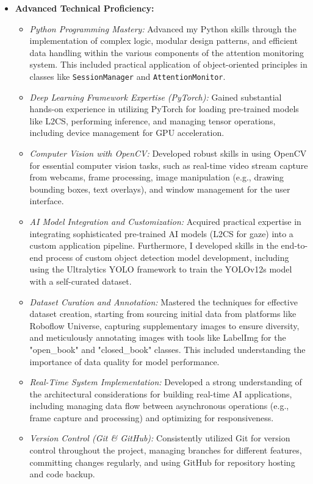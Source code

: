 \begin{itemize}
    \item \textbf{Advanced Technical Proficiency:}
    \begin{itemize}
        \item \textit{Python Programming Mastery:} Advanced my Python skills through the implementation of complex logic, modular design patterns, and efficient data handling within the various components of the attention monitoring system. This included practical application of object-oriented principles in classes like \texttt{SessionManager} and \texttt{AttentionMonitor}.
        \item \textit{Deep Learning Framework Expertise (PyTorch):} Gained substantial hands-on experience in utilizing PyTorch for loading pre-trained models like L2CS, performing inference, and managing tensor operations, including device management for GPU acceleration.
        \item \textit{Computer Vision with OpenCV:} Developed robust skills in using OpenCV for essential computer vision tasks, such as real-time video stream capture from webcams, frame processing, image manipulation (e.g., drawing bounding boxes, text overlays), and window management for the user interface.
        \item \textit{AI Model Integration and Customization:} Acquired practical expertise in integrating sophisticated pre-trained AI models (L2CS for gaze) into a custom application pipeline. Furthermore, I developed skills in the end-to-end process of custom object detection model development, including using the Ultralytics YOLO framework to train the YOLOv12s model with a self-curated dataset.
        \item \textit{Dataset Curation and Annotation:} Mastered the techniques for effective dataset creation, starting from sourcing initial data from platforms like Roboflow Universe, capturing supplementary images to ensure diversity, and meticulously annotating images with tools like LabelImg for the "open\_book" and "closed\_book" classes. This included understanding the importance of data quality for model performance.
        \item \textit{Real-Time System Implementation:} Developed a strong understanding of the architectural considerations for building real-time AI applications, including managing data flow between asynchronous operations (e.g., frame capture and processing) and optimizing for responsiveness.
        \item \textit{Version Control (Git \& GitHub):} Consistently utilized Git for version control throughout the project, managing branches for different features, committing changes regularly, and using GitHub for repository hosting and code backup.

\end{itemize}
\end{itemize}
